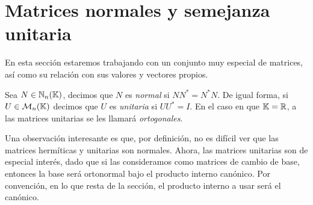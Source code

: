 \section{Matrices normales y semejanza unitaria}

En esta sección estaremos trabajando con un conjunto muy especial de matrices, así como su relación con sus valores y vectores propios. 

\begin{defi}
  Sea $N \in \mathbb{N}_n(\mathbb{K})$, decimos que $N$ es \emph{normal} si $NN^* = N^*N$. De igual forma, si $U\in\mathcal{M}_n(\mathbb{K})$ decimos que $U$ es \emph{unitaria} si $UU^* = I$. En el caso en que $\mathbb{K} = \mathbb{R}$, a las matrices unitarias se les llamará \emph{ortogonales}.
\end{defi}

Una observación interesante es que, por definición, no es difícil ver que las matrices hermíticas y unitarias son normales. Ahora, las matrices unitarias son de especial interés, dado que si las consideramos como matrices de cambio de base, entonces la base será ortonormal bajo el producto interno canónico. Por convención, en lo que resta de la sección, el producto interno a usar será el canónico.

